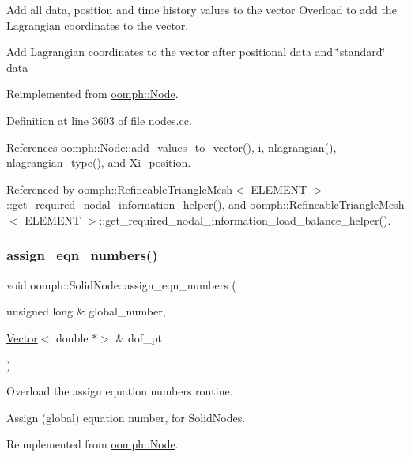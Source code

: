 Add all data, position and time history values to the vector Overload to add the Lagrangian coordinates to the vector. 

Add Lagrangian coordinates to the vector after positional data and \char`\"{}standard\char`\"{} data 

Reimplemented from \hyperlink{classoomph_1_1Node_a11400682e1fd2851777234a779e8bf8d}{oomph\+::\+Node}.



Definition at line 3603 of file nodes.\+cc.



References oomph\+::\+Node\+::add\+\_\+values\+\_\+to\+\_\+vector(), i, nlagrangian(), nlagrangian\+\_\+type(), and Xi\+\_\+position.



Referenced by oomph\+::\+Refineable\+Triangle\+Mesh$<$ E\+L\+E\+M\+E\+N\+T $>$\+::get\+\_\+required\+\_\+nodal\+\_\+information\+\_\+helper(), and oomph\+::\+Refineable\+Triangle\+Mesh$<$ E\+L\+E\+M\+E\+N\+T $>$\+::get\+\_\+required\+\_\+nodal\+\_\+information\+\_\+load\+\_\+balance\+\_\+helper().

\mbox{\label{classoomph_1_1SolidNode_aae4b4c238455ded700e5aac8b058e27d}} 
\subsubsection{\texorpdfstring{assign\+\_\+eqn\+\_\+numbers()}{assign\_eqn\_numbers()}}
{\footnotesize\ttfamily void oomph\+::\+Solid\+Node\+::assign\+\_\+eqn\+\_\+numbers (\begin{DoxyParamCaption}\item[{unsigned long \&}]{global\+\_\+number,  }\item[{\hyperlink{classoomph_1_1Vector}{Vector}$<$ double $\ast$$>$ \&}]{dof\+\_\+pt }\end{DoxyParamCaption})\hspace{0.3cm}{\ttfamily [virtual]}}



Overload the assign equation numbers routine. 

Assign (global) equation number, for Solid\+Nodes. 

Reimplemented from \hyperlink{classoomph_1_1Node_a84ee77907c07ede64d98e809d9b0ffe0}{oomph\+::\+Node}.



